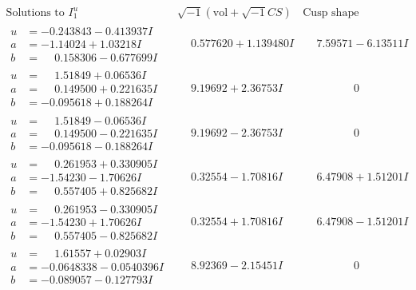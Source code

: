 \documentclass[1p]{elsarticle_modified}
\theoremstyle{definition}
\newcommand{\I}{\sqrt{-1}}
\begin{document}
$$\begin{array}{c|c|c}
\text{Solutions to }I^u_{1}& \I (\text{vol} + \sqrt{-1}CS) & \text{Cusp shape}\\
 \hline 
\begin{aligned}
u &= -0.243843 - 0.413937 I \\
a &= -1.14024 + 1.03218 I \\
b &= \phantom{-}0.158306 - 0.677699 I\end{aligned}
 & \phantom{-}0.577620 + 1.139480 I & \phantom{-}7.59571 - 6.13511 I \\ \hline\begin{aligned}
u &= \phantom{-}1.51849 + 0.06536 I \\
a &= \phantom{-}0.149500 + 0.221635 I \\
b &= -0.095618 + 0.188264 I\end{aligned}
 & \phantom{-}9.19692 + 2.36753 I & \phantom{-0.000000 } 0 \\ \hline\begin{aligned}
u &= \phantom{-}1.51849 - 0.06536 I \\
a &= \phantom{-}0.149500 - 0.221635 I \\
b &= -0.095618 - 0.188264 I\end{aligned}
 & \phantom{-}9.19692 - 2.36753 I & \phantom{-0.000000 } 0 \\ \hline\begin{aligned}
u &= \phantom{-}0.261953 + 0.330905 I \\
a &= -1.54230 - 1.70626 I \\
b &= \phantom{-}0.557405 + 0.825682 I\end{aligned}
 & \phantom{-}0.32554 - 1.70816 I & \phantom{-}6.47908 + 1.51201 I \\ \hline\begin{aligned}
u &= \phantom{-}0.261953 - 0.330905 I \\
a &= -1.54230 + 1.70626 I \\
b &= \phantom{-}0.557405 - 0.825682 I\end{aligned}
 & \phantom{-}0.32554 + 1.70816 I & \phantom{-}6.47908 - 1.51201 I \\ \hline\begin{aligned}
u &= \phantom{-}1.61557 + 0.02903 I \\
a &= -0.0648338 - 0.0540396 I \\
b &= -0.089057 - 0.127793 I\end{aligned}
 & \phantom{-}8.92369 - 2.15451 I & \phantom{-0.000000 } 0 \\ \hline\begin{aligned}

\end{aligned}
\end{array}$$
\end{document}
